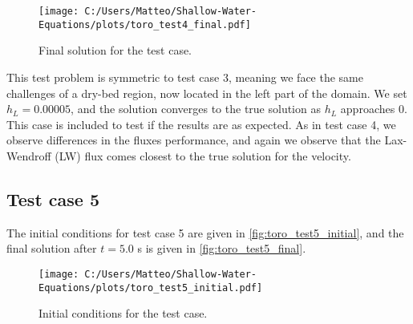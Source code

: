 \begin{figure}[H]
    \centering
    \texttt{[image: C:/Users/Matteo/Shallow-Water-Equations/plots/toro\_test4\_final.pdf]}
    \caption{Final solution for the test case.}\label{fig:toro_test4_final}
\end{figure}
This test problem is symmetric to test case 3, meaning we face the same challenges of a dry-bed region, now located in the left part of the domain.
We set $h_L = 0.00005$, and the solution converges to the true solution as $h_L$ approaches 0.
This case is included to test if the results are as expected.
As in test case 4, we observe differences in the fluxes performance, and again we observe that the Lax-Wendroff (LW) flux comes closest to the true solution for the velocity.

\newpage
\subsection*{Test case 5}
The initial conditions for test case 5 are given in \autoref{fig:toro_test5_initial}, and the final solution after $t=5.0$ s is given in \autoref{fig:toro_test5_final}.
\begin{figure}[H]
    \centering
    \texttt{[image: C:/Users/Matteo/Shallow-Water-Equations/plots/toro\_test5\_initial.pdf]}
    \caption{Initial conditions for the test case.}\label{fig:toro_test5_initial}
\end{figure}

